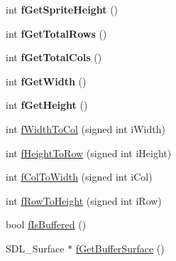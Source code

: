 \begin{DoxyCompactItemize}
\item 
\hypertarget{classc_sprite_layer_ae52da0b10607de597a21b134afbded60}{int {\bfseries f\-Get\-Sprite\-Height} ()}\label{classc_sprite_layer_ae52da0b10607de597a21b134afbded60}

\item 
\hypertarget{classc_sprite_layer_abc9e08d4301a3c9a8569d4eacd507f12}{int {\bfseries f\-Get\-Total\-Rows} ()}\label{classc_sprite_layer_abc9e08d4301a3c9a8569d4eacd507f12}

\item 
\hypertarget{classc_sprite_layer_a8aa4dc73f3f4db80bdec1ba850a39ce9}{int {\bfseries f\-Get\-Total\-Cols} ()}\label{classc_sprite_layer_a8aa4dc73f3f4db80bdec1ba850a39ce9}

\item 
\hypertarget{classc_sprite_layer_a91fdb4fe056247ea5ddcc8205ca6ca95}{int {\bfseries f\-Get\-Width} ()}\label{classc_sprite_layer_a91fdb4fe056247ea5ddcc8205ca6ca95}

\item 
\hypertarget{classc_sprite_layer_a1107b0df24b0cc0a33d2979a8a87bfde}{int {\bfseries f\-Get\-Height} ()}\label{classc_sprite_layer_a1107b0df24b0cc0a33d2979a8a87bfde}

\item 
int \hyperlink{classc_sprite_layer_a2c48b0336ed1f0f0ed2a05597516601c}{f\-Width\-To\-Col} (signed int i\-Width)
\item 
int \hyperlink{classc_sprite_layer_ac304d2fe01f4134c89dbce028c687d4b}{f\-Height\-To\-Row} (signed int i\-Height)
\item 
int \hyperlink{classc_sprite_layer_ac26f356df879a4f1763d943a01b6dfb2}{f\-Col\-To\-Width} (signed int i\-Col)
\item 
int \hyperlink{classc_sprite_layer_aa76ee42d48caa0417b97a7ff61d94458}{f\-Row\-To\-Height} (signed int i\-Row)
\item 
bool \hyperlink{classc_sprite_layer_ab594c1e5bb22b783827dcf043d4db36d}{f\-Is\-Buffered} ()
\item 
S\-D\-L\-\_\-\-Surface $\ast$ \hyperlink{classc_sprite_layer_a826a9f912c57d78a584507f697d6f3ab}{f\-Get\-Buffer\-Surface} ()
\end{DoxyCompactItemize}
